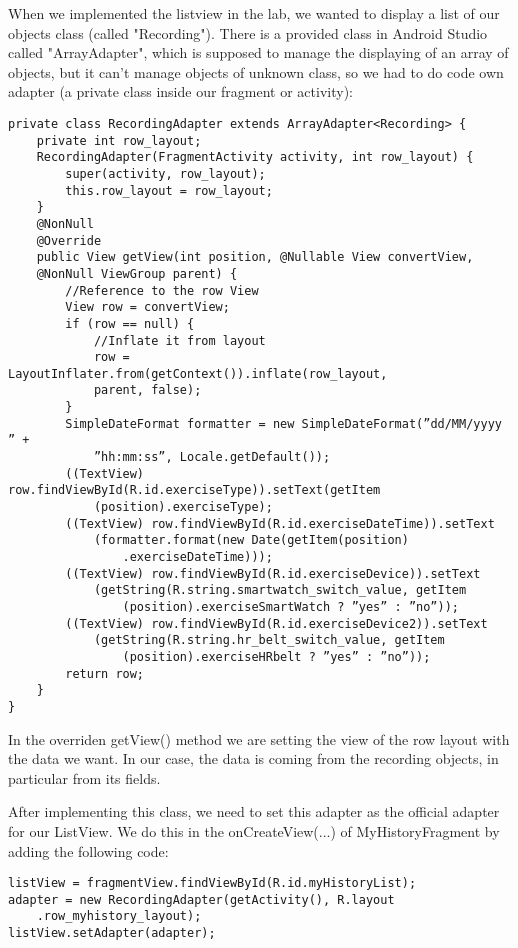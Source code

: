 \documentclass[11pt]{article}
\begin{document}
When we implemented the listview in the lab, we wanted to display a list of our objects class (called "Recording"). There is a provided class in Android Studio called "ArrayAdapter", which is supposed to manage the displaying of an array of objects, but it can't manage objects of unknown class, so we had to do code own adapter (a private class inside our fragment or activity):
\begin{lstlisting}
private class RecordingAdapter extends ArrayAdapter<Recording> {
    private int row_layout;
    RecordingAdapter(FragmentActivity activity, int row_layout) {
        super(activity, row_layout);
        this.row_layout = row_layout;
    }
    @NonNull
    @Override
    public View getView(int position, @Nullable View convertView,
    @NonNull ViewGroup parent) {
        //Reference to the row View
        View row = convertView;
        if (row == null) {
            //Inflate it from layout
            row = LayoutInflater.from(getContext()).inflate(row_layout,
            parent, false);
        }
        SimpleDateFormat formatter = new SimpleDateFormat(”dd/MM/yyyy ” +
            ”hh:mm:ss”, Locale.getDefault());
        ((TextView) row.findViewById(R.id.exerciseType)).setText(getItem
            (position).exerciseType);
        ((TextView) row.findViewById(R.id.exerciseDateTime)).setText
            (formatter.format(new Date(getItem(position)
                .exerciseDateTime)));
        ((TextView) row.findViewById(R.id.exerciseDevice)).setText
            (getString(R.string.smartwatch_switch_value, getItem
                (position).exerciseSmartWatch ? ”yes” : ”no”));
        ((TextView) row.findViewById(R.id.exerciseDevice2)).setText
            (getString(R.string.hr_belt_switch_value, getItem
                (position).exerciseHRbelt ? ”yes” : ”no”));
        return row;
    }
}
\end{lstlisting}
In the overriden getView() method we are setting the view of the row layout with the data we want. In our case, the data is coming from the recording objects, in particular from its fields.

After implementing this class, we need to set this adapter as the official adapter for our ListView. We do this in the
onCreateView(...) of MyHistoryFragment by adding the following code:
\begin{lstlisting}
listView = fragmentView.findViewById(R.id.myHistoryList);
adapter = new RecordingAdapter(getActivity(), R.layout
    .row_myhistory_layout);
listView.setAdapter(adapter);
\end{lstlisting}
\end{document}
